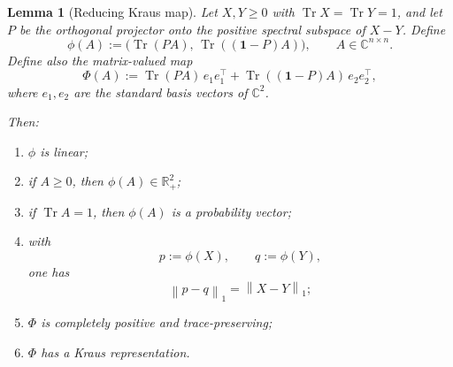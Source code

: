 \documentclass[11pt]{article}
\newtheorem{lemma}{Lemma}
\theoremstyle{definition}
\DeclareMathOperator{\Tr}{Tr}
\newcommand{\1}{\mathbf{1}}
\newcommand{\norm}[1]{\left\lVert #1 \right\rVert}
\begin{document}
\begin{lemma}[Reducing Kraus map]\label{lem:reducing-map}
Let $X,Y\ge 0$ with $\Tr X=\Tr Y=1$, and let $P$ be the orthogonal projector onto the positive spectral subspace of $X-Y$. Define
\begin{equation}\label{eq:def-phi-vector}
\phi(A):=\bigl(\Tr(PA),\,\Tr((\1-P)A)\bigr),
\qquad A\in \mathbb{C}^{n\times n}.
\end{equation}
Define also the matrix-valued map
\begin{equation}\label{eq:def-phi-matrix}
\Phi(A):=\Tr(PA)\,e_1e_1^\top+\Tr((\1-P)A)\,e_2e_2^\top,
\end{equation}
where $e_1,e_2$ are the standard basis vectors of $\mathbb{C}^2$.

Then:
\begin{enumerate}[label=(\roman*)]
\item $\phi$ is linear;
\item if $A\ge 0$, then $\phi(A)\in \mathbb{R}_+^2$;
\item if $\Tr A=1$, then $\phi(A)$ is a probability vector;
\item with
\[
p:=\phi(X),\qquad q:=\phi(Y),
\]
one has
\begin{equation}\label{eq:l1-preserved}
\norm{p-q}_1=\norm{X-Y}_1;
\end{equation}
\item $\Phi$ is completely positive and trace-preserving;
\item $\Phi$ has a Kraus representation.
\end{enumerate}
\end{lemma}
\end{document}
